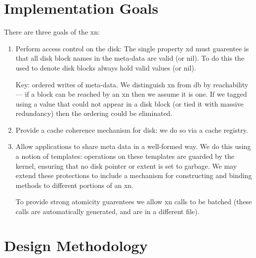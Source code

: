 \section{Implementation Goals}

There are three goals of the xn:
\begin{enumerate}
        \item Perform access control on the disk:  The single property xd
        must guarentee is that all disk block names in the meta-data
        are valid (or nil).  To do this the used to denote disk blocks
        always hold valid values (or nil).

        Key: ordered writes of meta-data.  We distinguish xn from db by
        reachability --- if a block can be reached by an xn then we assume
        it is one.  If we tagged using a value that could not appear in
        a disk block (or tied it with massive redundancy) then the ordering
        could be eliminated.

        \item Provide a cache coherence mechanism for disk: we do so
        via a cache registry.

        \item Allow applications to share meta data in a well-formed way.
        We do this using a notion of templates: operations on these
        templates are  guarded by the kernel, ensuring that no
        disk pointer or extent is set to garbage.  We may extend
        these protections to include a mechanism for constructing
        and binding methods to different portions of an xn.

        To provide strong atomicity guarentees we allow xn calls
        to be batched (these calls are automatically generated,
        and are in a different file).

\end{enumerate}

\section{Design Methodology}

